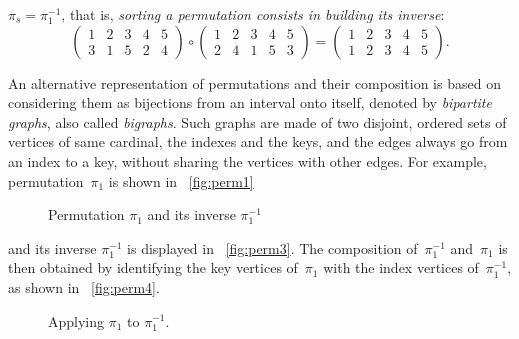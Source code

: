 \(\pi_s = \pi_1^{-1}\), that is, \emph{sorting a permutation consists
  in building its inverse}:
\begin{equation*}
\begin{pmatrix}
1 & 2 & 3 & 4 & 5\\
3 & 1 & 5 & 2 & 4
\end{pmatrix}
\circ
\begin{pmatrix}
1 & 2 & 3 & 4 & 5\\
2 & 4 & 1 & 5 & 3
\end{pmatrix}
=
\begin{pmatrix}
1 & 2 & 3 & 4 & 5\\
1 & 2 & 3 & 4 & 5
\end{pmatrix}.
\end{equation*}

An alternative representation of permutations and their
composition is based on considering
them as bijections from an interval onto itself, denoted by
\emph{bipartite graphs}, also called
\emph{bigraphs}. Such
graphs are made of two disjoint, ordered sets of vertices of same
cardinal, the indexes and the keys, and the edges always go from an
index to a key, without sharing the vertices with other edges. For
example, permutation~\(\pi_1\) is shown in \fig~\vref{fig:perm1}
\begin{figure}
\centering
{}
\qquad\qquad
{}
\caption{Permutation \(\pi_1\) and its inverse \(\pi_1^{-1}\)}
\label{fig:pi_1}
\end{figure}
and its inverse \(\pi_1^{-1}\) is displayed in
\fig~\vref{fig:perm3}. The composition
of~\(\pi_1^{-1}\) and~\(\pi_1\) is then obtained by identifying the
key vertices of~\(\pi_1\) with the index vertices of~\(\pi_1^{-1}\),
as shown in \fig~\vref{fig:perm4}.
\begin{figure}[t]
\centering
{}%
\qquad\qquad
{}
\caption{Applying \(\pi_1\) to \(\pi_1^{-1}\).}
\end{figure}
